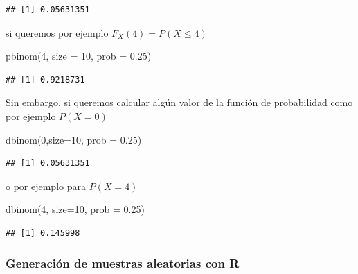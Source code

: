 \documentclass[
]{article}
\newenvironment{Shaded}{\begin{snugshade}}{\end{snugshade}}
\newcommand{\AttributeTok}[1]{\textcolor[rgb]{0.77,0.63,0.00}{#1}}
\newcommand{\DecValTok}[1]{\textcolor[rgb]{0.00,0.00,0.81}{#1}}
\newcommand{\FloatTok}[1]{\textcolor[rgb]{0.00,0.00,0.81}{#1}}
\newcommand{\FunctionTok}[1]{\textcolor[rgb]{0.00,0.00,0.00}{#1}}
\newcommand{\NormalTok}[1]{#1}
\begin{document}
\begin{verbatim}
## [1] 0.05631351
\end{verbatim}

si queremos por ejemplo \(F_X(4) = P(X\leq 4)\)

\begin{Shaded}
\begin{Highlighting}[]
\FunctionTok{pbinom}\NormalTok{(}\DecValTok{4}\NormalTok{, }\AttributeTok{size =} \DecValTok{10}\NormalTok{, }\AttributeTok{prob =} \FloatTok{0.25}\NormalTok{)}
\end{Highlighting}
\end{Shaded}

\begin{verbatim}
## [1] 0.9218731
\end{verbatim}

Sin embargo, si queremos calcular algún valor de la función de
probabilidad como por ejemplo \(P(X=0)\)

\begin{Shaded}
\begin{Highlighting}[]
\FunctionTok{dbinom}\NormalTok{(}\DecValTok{0}\NormalTok{,}\AttributeTok{size=}\DecValTok{10}\NormalTok{, }\AttributeTok{prob =} \FloatTok{0.25}\NormalTok{)}
\end{Highlighting}
\end{Shaded}

\begin{verbatim}
## [1] 0.05631351
\end{verbatim}

o por ejemplo para \(P(X=4)\)

\begin{Shaded}
\begin{Highlighting}[]
\FunctionTok{dbinom}\NormalTok{(}\DecValTok{4}\NormalTok{, }\AttributeTok{size=}\DecValTok{10}\NormalTok{, }\AttributeTok{prob =} \FloatTok{0.25}\NormalTok{)}
\end{Highlighting}
\end{Shaded}

\begin{verbatim}
## [1] 0.145998
\end{verbatim}

\hypertarget{generaciuxf3n-de-muestras-aleatorias-con-r}{%
\subsubsection{Generación de muestras aleatorias con
R}\label{generaciuxf3n-de-muestras-aleatorias-con-r}}
\end{document}
